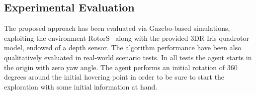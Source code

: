 \subsection{Experimental Evaluation}%
\label{SEC:EXPLORATION-EXPERIMENTAL-EVALUATION}
The proposed approach has been evaluated via Gazebo-based simulations, exploiting the environment RotorS~\cite{furrer2016rotors} along with
the provided 3DR Iris quadrotor model, endowed of a depth sensor. The algorithm performance have been also qualitatively evaluated in
real-world scenario tests. In all tests the agent starts in the origin with zero yaw angle. The agent performs an initial rotation
of $360$ degrees around the initial hovering point in order to be sure to start the exploration with some initial information at hand.
\begin{figure}[!t]
	\begin{center}
		\begin{minipage}{.4\linewidth}
			\centering
		\end{minipage}
		\begin{minipage}{.4\linewidth}
			\centering

\end{minipage}
\end{center}
\end{figure}
